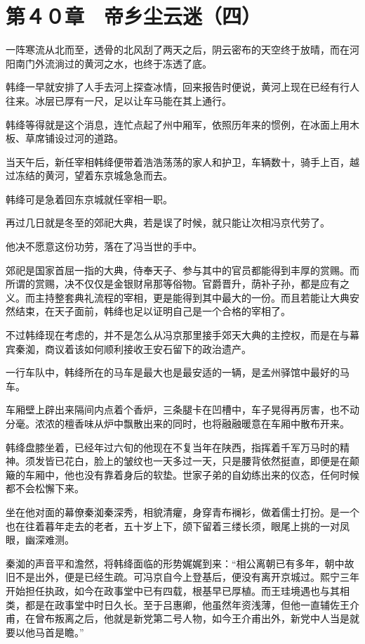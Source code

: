 \section{第４０章　帝乡尘云迷（四）}

一阵寒流从北而至，透骨的北风刮了两天之后，阴云密布的天空终于放晴，而在河阳南门外流淌过的黄河之水，也终于冻透了底。

韩绛一早就安排了人手去河上探查冰情，回来报告时便说，黄河上现在已经有行人往来。冰层已厚有一尺，足以让车马能在其上通行。

韩绛等得就是这个消息，连忙点起了州中厢军，依照历年来的惯例，在冰面上用木板、草席铺设过河的道路。

当天午后，新任宰相韩绛便带着浩浩荡荡的家人和护卫，车辆数十，骑手上百，越过冻结的黄河，望着东京城急急而去。

韩绛可是急着回东京城就任宰相一职。

再过几日就是冬至的郊祀大典，若是误了时候，就只能让次相冯京代劳了。

他决不愿意这份功劳，落在了冯当世的手中。

郊祀是国家首屈一指的大典，侍奉天子、参与其中的官员都能得到丰厚的赏赐。而所谓的赏赐，决不仅仅是金银财帛那等俗物。官爵晋升，荫补子孙，都是应有之义。而主持整套典礼流程的宰相，更是能得到其中最大的一份。而且若能让大典安然结束，在天子面前，韩绛也足以证明自己是一个合格的宰相了。

不过韩绛现在考虑的，并不是怎么从冯京那里接手郊天大典的主控权，而是在与幕宾秦洳，商议着该如何顺利接收王安石留下的政治遗产。

一行车队中，韩绛所在的马车是最大也是最安适的一辆，是孟州驿馆中最好的马车。

车厢壁上辟出来隔间内点着个香炉，三条腿卡在凹槽中，车子晃得再厉害，也不动分毫。浓浓的檀香味从炉中飘散出来的同时，也将融融暖意在车厢中散布开来。

韩绛盘膝坐着，已经年过六旬的他现在不复当年在陕西，指挥着千军万马时的精神。须发皆已花白，脸上的皱纹也一天多过一天，只是腰背依然挺直，即便是在颠簸的车厢中，他也没有靠着身后的软垫。世家子弟的自幼练出来的仪态，任何时候都不会松懈下来。

坐在他对面的幕僚秦洳秦深秀，相貌清癯，身穿青布襕衫，做着儒士打扮。是一个也在往着暮年走去的老者，五十岁上下，颌下留着三缕长须，眼尾上挑的一对凤眼，幽深难测。

秦洳的声音平和澹然，将韩绛面临的形势娓娓到来：“相公离朝已有多年，朝中故旧不是出外，便是已经生疏。可冯京自今上登基后，便没有离开京城过。熙宁三年开始担任执政，如今在政事堂中已有四载，根基早已厚植。而王珪境遇也与其相类，都是在政事堂中时日久长。至于吕惠卿，他虽然年资浅薄，但他一直辅佐王介甫，在曾布叛离之后，他就是新党第二号人物，如今王介甫出外，新党中人当是就要以他马首是瞻。”

